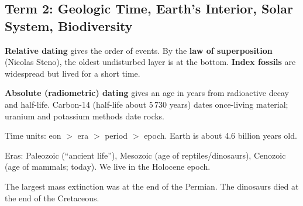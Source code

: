 \begin{gradebody}
\subsection{Term 2: Geologic Time, Earth's Interior, Solar System, Biodiversity}

\kf
\begin{keyfacts}
\item \textbf{Relative dating} gives the order of events. By the \textbf{law of superposition} (Nicolas Steno), the oldest undisturbed layer is at the bottom. \textbf{Index fossils} are widespread but lived for a short time.
\item \textbf{Absolute (radiometric) dating} gives an age in years from radioactive decay and half-life. Carbon-14 (half-life about 5\,730 years) dates once-living material; uranium and potassium methods date rocks.
\item Time units: eon $>$ era $>$ period $>$ epoch. Earth is about 4.6 billion years old.
\item Eras: Paleozoic (``ancient life''), Mesozoic (age of reptiles/dinosaurs), Cenozoic (age of mammals; today). We live in the Holocene epoch.
\item The largest mass extinction was at the end of the Permian. The dinosaurs died at the end of the Cretaceous.
\end{keyfacts}
\cards
{}
\begin{confbox}
\end{confbox}


\end{gradebody}
